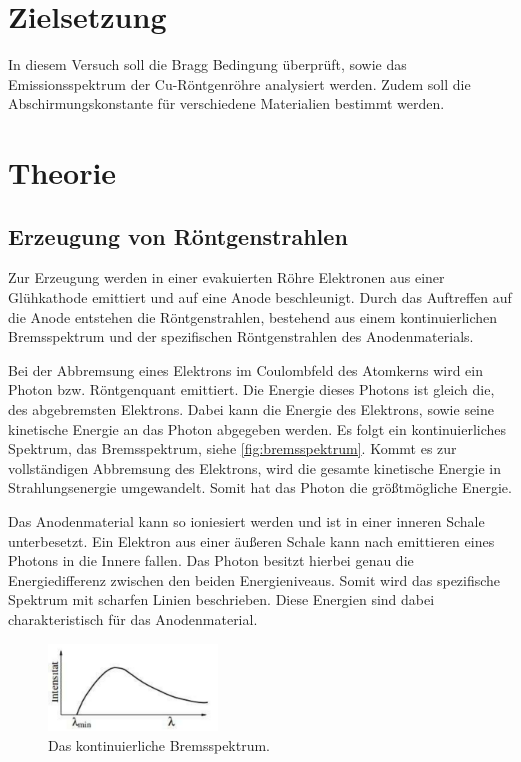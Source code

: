\section{Zielsetzung}
\label{sec:Zielsetzung}
In diesem Versuch soll die Bragg Bedingung überprüft, sowie das Emissionsspektrum der Cu-Röntgenröhre analysiert werden.
Zudem soll die Abschirmungskonstante für verschiedene Materialien bestimmt werden.

\section{Theorie}
\label{sec:Theorie}

\subsection{Erzeugung von Röntgenstrahlen}
\label{subsec:Erzeugung}

Zur Erzeugung werden in einer evakuierten Röhre Elektronen aus einer Glühkathode emittiert und auf eine Anode beschleunigt.
Durch das Auftreffen auf die Anode entstehen die Röntgenstrahlen, bestehend aus einem kontinuierlichen Bremsspektrum und
der spezifischen Röntgenstrahlen des Anodenmaterials.

\noindent
Bei der Abbremsung eines Elektrons im Coulombfeld des Atomkerns wird ein Photon bzw. Röntgenquant emittiert.
Die Energie dieses Photons ist gleich die, des abgebremsten Elektrons.
Dabei kann die Energie des Elektrons, sowie seine kinetische Energie an das Photon abgegeben werden.
Es folgt ein kontinuierliches Spektrum, das Bremsspektrum, siehe \autoref{fig:bremsspektrum}.
Kommt es zur vollständigen Abbremsung des Elektrons, wird die gesamte kinetische Energie in Strahlungsenergie umgewandelt.
Somit hat das Photon die größtmögliche Energie.

\noindent
Das Anodenmaterial kann so ioniesiert werden und ist in einer inneren Schale unterbesetzt.
Ein Elektron aus einer äußeren Schale kann nach emittieren eines Photons in die Innere fallen.
Das Photon besitzt hierbei genau die Energiedifferenz zwischen den beiden Energieniveaus.
Somit wird das spezifische Spektrum mit scharfen Linien beschrieben.
Diese Energien sind dabei charakteristisch für das Anodenmaterial.

\begin{figure}
    \centering
    \includegraphics[width=0.4\textwidth]{content/bremsspektrum.pdf}
    \caption{Das kontinuierliche Bremsspektrum.\cite{anleitung}}
    \label{fig:bremsspektrum}
\end{figure}

